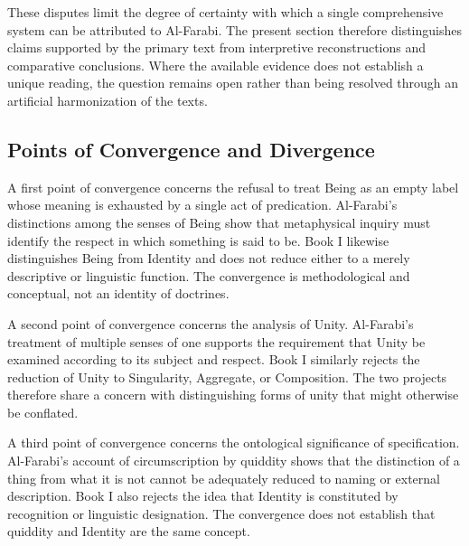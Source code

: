 These disputes limit the degree
of certainty with which a
single comprehensive system
can be attributed to Al-Farabi.
The present section therefore
distinguishes claims supported
by the primary text from
interpretive reconstructions
and comparative conclusions.
Where the available evidence
does not establish a unique
reading, the question remains
open rather than being resolved
through an artificial harmonization
of the texts.



\subsection{Points of Convergence and Divergence}
\label{subsec:ch08-farabi-convergence-divergence}

\label{para:VS.B01.P01.C08.S12.SS13.P001}

A first point of convergence
concerns the refusal to treat
Being as an empty label
whose meaning is exhausted
by a single act of predication.
Al-Farabi's distinctions
among the senses of Being
show that metaphysical inquiry
must identify the respect
in which something is said
to be. Book I likewise
distinguishes Being from
Identity and does not
reduce either to a merely
descriptive or linguistic
function. The convergence
is methodological and
conceptual, not an identity
of doctrines.

\label{para:VS.B01.P01.C08.S12.SS13.P002}

A second point of convergence
concerns the analysis of Unity.
Al-Farabi's treatment of
multiple senses of one
supports the requirement
that Unity be examined
according to its subject
and respect. Book I similarly
rejects the reduction of
Unity to Singularity,
Aggregate, or Composition.
The two projects therefore
share a concern with
distinguishing forms of
unity that might otherwise
be conflated.

\label{para:VS.B01.P01.C08.S12.SS13.P003}

A third point of convergence
concerns the ontological
significance of specification.
Al-Farabi's account of
circumscription by quiddity
shows that the distinction
of a thing from what it is
not cannot be adequately
reduced to naming or
external description. Book I
also rejects the idea that
Identity is constituted
by recognition or linguistic
designation. The convergence
does not establish that
quiddity and Identity are
the same concept.

